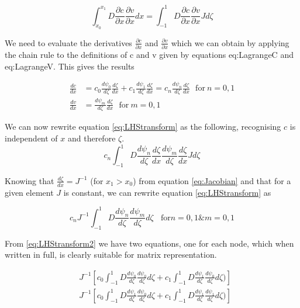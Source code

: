 \documentclass[11pt]{article}
\begin{document}
\begin{equation} \label{eq:LHStransform}
\int_{x_0}^{x_{1}} D \frac{\partial c}{\partial x}  \frac{\partial v}{\partial x}  dx =  \int_{-1}^{1} D \frac{\partial c}{\partial x}  \frac{\partial v}{\partial x} J d\zeta
\end{equation}

We need to evaluate the derivatives $\frac{\partial c}{\partial x}$ and $ \frac{\partial v}{\partial x}$ which we can obtain by applying the chain rule to the definitions of c and v given by equations {eq:LagrangeC} and {eq:LagrangeV}. This gives the results

\begin{subequations}
\label{eq:LagrangeD}
\begin{align}
\frac{dc}{dx} &= c_{0}\frac{d\psi_{0}}{d\zeta}\frac{d\zeta}{dx} + c_1\frac{d\psi_{1}}{d\zeta}\frac{d\zeta}{dx} = c_n\frac{d\psi_{n}}{d\zeta}\frac{d\zeta}{dx} \label{eq:LagrangeDC} \ \ \ \text{for} \ n =0,1\\
\frac{dv}{dx} &= \frac{d\psi_{m}}{d\zeta}\frac{d\zeta}{dx} \ \ \ \text{for} \ m =0,1 \label{eq:LagrangeDV} 
\end{align}
\end{subequations}

We can now rewrite equation \ref{eq:LHStransform} as the following, recognising $c$ is independent of $x$ and therefore $\zeta$.
\begin{equation} \label{eq:LHStransform}
 c_n\int_{-1}^{1} D \frac{d\psi_{n}}{d\zeta}\frac{d\zeta}{dx} \frac{d\psi_{m}}{d\zeta}\frac{d\zeta}{dx} J d\zeta
\end{equation}

Knowing that $\frac{d\zeta}{dx} = J^{-1}$ (for $x_1 > x_0$) from equation \ref{eq:Jacobian} and that for a given element $J$ is constant, we can rewrite equation \ref{eq:LHStransform} as

\begin{equation} \label{eq:LHStransform2}
 c_nJ^{-1}\int_{-1}^{1} D \frac{d\psi_{n}}{d\zeta}\frac{d\psi_{m}}{d\zeta} d\zeta \ \ \ \ \text{for} n= 0,1 \& m = 0,1
\end{equation}




From \ref{eq:LHStransform2} we have two equations, one for each node, which when written in full, is clearly suitable for matrix representation.

\begin{subequations}
\label{eq:matrixform}
\begin{align}
&J^{-1} \left  [c_0 \int_{-1}^{1} D \frac{d\psi_{0}}{d\zeta} \frac{d\psi_{0}}{d \zeta} d \zeta + c_1 \int_{-1}^{1} D \frac{d\psi_{1}}{d\zeta} \frac{d\psi_{0}}{d\zeta}d\zeta ) \right ] \label{eq:row1} \\
&J^{-1} \left  [ c_0 \int_{-1}^{1} D \frac{d\psi_{1}}{d\zeta} \frac{d\psi_{0}}{d \zeta} d \zeta + c_1 \int_{-1}^{1} D \frac{d\psi_{1}}{d\zeta} \frac{d\psi_{1}}{d\zeta}d\zeta ) \right ] \label{eq:row2} 
\end{align}
\end{subequations}
\end{document}
